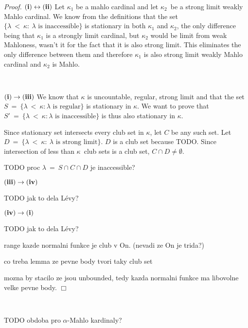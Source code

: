 \documentclass[12pt,a4paper]{article}
\newenvironment{proof}
{\noindent \textit{Proof.}}
{\hspace*{\fill} $\Box$}
\renewcommand{\iff}{\leftrightarrow}
\newcommand{\then}{\rightarrow}
\begin{document}
\begin{proof}
$\bold{(i) \iff \bold{(ii)}}$
Let $\kappa_1$ be a mahlo cardinal and let $\kappa_2$ be a strong limit weakly Mahlo cardinal. We know from the definitions that the set $\{\lambda\ <\ \kappa:\ \lambda\mbox{ is inaccessible}\}$ is stationary in both $\kappa_1$ and $\kappa_2$, the only difference being that $\kappa_1$ is a strongly limit cardinal, but $\kappa_2$ would be limit from weak Mahloness, wasn't it for the fact that it is also strong limit. This eliminates the only difference between them and therefore $\kappa_1$ is also strong limit weakly Mahlo cardinal and $\kappa_2$ is Mahlo.

\

$\bold{(i) \then (iii)}$
We know that $\kappa$ is uncountable, regular, strong limit and that the set $S\ =\ \{\lambda\ <\ \kappa: \lambda\mbox{ is regular}\}$ is stationary in $\kappa$. 
We want to prove that $S'\ =\ \{\lambda\ <\ \kappa: \lambda\mbox{ is inaccessible}\}$ is thus also stationary in $\kappa$.

Since stationary set intersects every club set in $\kappa$, let $C$ be any such set. Let $D\ =\ \{ \lambda\ <\ \kappa:\ \lambda\mbox{ is strong limit}\}$. 
$D$ is a club set because TODO.
Since intersection of less than $\kappa$ club sets is a club set, $C \cap D \neq \emptyset$. 

TODO proc $\lambda\ =\ S \cap C \cap D$ je inaccessible?


$\bold{(iii) \then (iv)}$

TODO jak to dela Lévy? 

$\bold{(iv) \then (i)}$

TODO jak to dela Lévy? 

range kazde normalni funkce je club v On. (nevadi ze On je trida?)

co treba lemma ze pevne body tvori taky club set

mozna by stacilo ze jsou unbounded, tedy kazda normalni funkce ma libovolne velke pevne body.
\end{proof}

\

TODO obdoba pro $\alpha$-Mahlo kardinaly?
\end{document}
